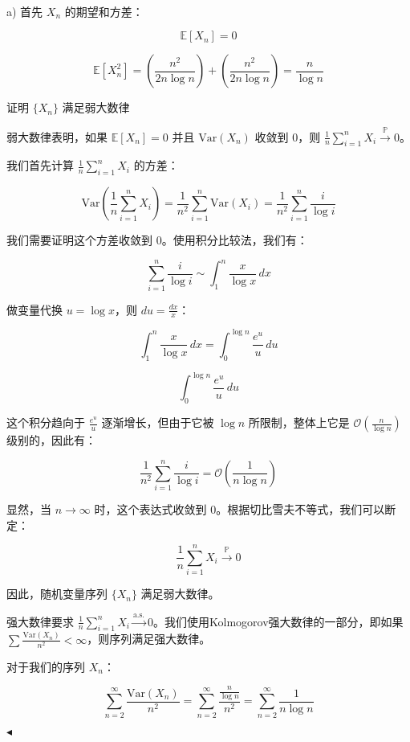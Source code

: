 \documentclass[11pt]{article}
\newenvironment{question}[2][Question]{\begin{trivlist}
\item[\hskip \labelsep {\bfseries #1}\hskip \labelsep {\bfseries #2.}]}{\hfill$\blacktriangleleft$\end{trivlist}}
\begin{document}
    
    \begin{question}{3 (10') (大数定律)}~\\

a) 首先 \( X_n \) 的期望和方差：

\[ \mathbb{E}[X_n] = 0 \]

\[ \mathbb{E}[X_n^2] = \left(\frac{n^2}{2n \log n}\right) + \left(\frac{n^2}{2n \log n}\right) = \frac{n}{\log n} \]

 证明 \( \{X_n\} \) 满足弱大数律

弱大数律表明，如果 \(\mathbb{E}[X_n] = 0\) 并且 \(\mathrm{Var}(X_n)\) 收敛到 0，则 \(\frac{1}{n} \sum_{i=1}^{n} X_i \xrightarrow{\mathbb{P}} 0\)。

我们首先计算 \(\frac{1}{n} \sum_{i=1}^{n} X_i\) 的方差：

\[ \mathrm{Var}\left( \frac{1}{n} \sum_{i=1}^{n} X_i \right) = \frac{1}{n^2} \sum_{i=1}^{n} \mathrm{Var}(X_i) = \frac{1}{n^2} \sum_{i=1}^{n} \frac{i}{\log i} \]

我们需要证明这个方差收敛到 0。使用积分比较法，我们有：

\[ \sum_{i=1}^{n} \frac{i}{\log i} \sim \int_{1}^{n} \frac{x}{\log x} \, dx \]

做变量代换 \( u = \log x \)，则 \( du = \frac{dx}{x} \)：

\[ \int_{1}^{n} \frac{x}{\log x} \, dx = \int_{0}^{\log n} \frac{e^u}{u} \, du \]

\[ \int_{0}^{\log n} \frac{e^u}{u} \, du \]

这个积分趋向于 \(\frac{e^u}{u}\) 逐渐增长，但由于它被 \(\log n\) 所限制，整体上它是 \(\mathcal{O}(\frac{n}{\log n})\) 级别的，因此有：

\[ \frac{1}{n^2} \sum_{i=1}^{n} \frac{i}{\log i} = \mathcal{O}\left(\frac{1}{n \log n}\right) \]

显然，当 \(n \to \infty\) 时，这个表达式收敛到 0。根据切比雪夫不等式，我们可以断定：

\[ \frac{1}{n} \sum_{i=1}^{n} X_i \xrightarrow{\mathbb{P}} 0 \]

因此，随机变量序列 \(\{X_n\}\) 满足弱大数律。

强大数律要求 \(\frac{1}{n} \sum_{i=1}^{n} X_i \xrightarrow{\text{a.s.}} 0\)。我们使用Kolmogorov强大数律的一部分，即如果 \(\sum \frac{\mathrm{Var}(X_n)}{n^2} < \infty\)，则序列满足强大数律。

对于我们的序列 \(X_n\)：

\[ \sum_{n=2}^{\infty} \frac{\mathrm{Var}(X_n)}{n^2} = \sum_{n=2}^{\infty} \frac{\frac{n}{\log n}}{n^2} = \sum_{n=2}^{\infty} \frac{1}{n \log n} \]


\end{question}
\end{document}

